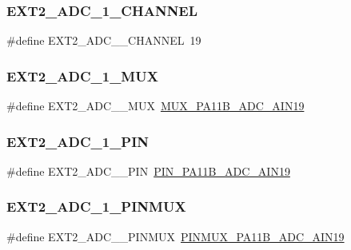 \subsubsection{\texorpdfstring{EXT2\_ADC\_1\_CHANNEL}{EXT2\_ADC\_1\_CHANNEL}}
{\footnotesize\ttfamily \#define E\+X\+T2\+\_\+\+A\+D\+C\+\_\+\_\+\+C\+H\+A\+N\+N\+EL~19}

\mbox{\label{group__samd21__xplained__pro__features__group_ga7de3785c01df710fbe80244bca6eb130}} 
\subsubsection{\texorpdfstring{EXT2\_ADC\_1\_MUX}{EXT2\_ADC\_1\_MUX}}
{\footnotesize\ttfamily \#define E\+X\+T2\+\_\+\+A\+D\+C\+\_\+\_\+\+M\+UX~\mbox{\hyperlink{pio_2samd21j18a_8h_a1c9d3ee528e4d137cb344ec37f78b536}{M\+U\+X\+\_\+\+P\+A11\+B\+\_\+\+A\+D\+C\+\_\+\+A\+I\+N19}}}

\mbox{\label{group__samd21__xplained__pro__features__group_gaf4cd3ff8f43d22ce11edfe40b02d0498}} 
\subsubsection{\texorpdfstring{EXT2\_ADC\_1\_PIN}{EXT2\_ADC\_1\_PIN}}
{\footnotesize\ttfamily \#define E\+X\+T2\+\_\+\+A\+D\+C\+\_\+\_\+\+P\+IN~\mbox{\hyperlink{pio_2samd21j18a_8h_a5f56dda410dca398fa92679ce6b01c46}{P\+I\+N\+\_\+\+P\+A11\+B\+\_\+\+A\+D\+C\+\_\+\+A\+I\+N19}}}

\mbox{\label{group__samd21__xplained__pro__features__group_ga32513ceb498b89de9facdcba65c559ca}} 
\subsubsection{\texorpdfstring{EXT2\_ADC\_1\_PINMUX}{EXT2\_ADC\_1\_PINMUX}}
{\footnotesize\ttfamily \#define E\+X\+T2\+\_\+\+A\+D\+C\+\_\+\_\+\+P\+I\+N\+M\+UX~\mbox{\hyperlink{pio_2samd21j18a_8h_a0c5a5cba5dbc784a96555e1b733ccb22}{P\+I\+N\+M\+U\+X\+\_\+\+P\+A11\+B\+\_\+\+A\+D\+C\+\_\+\+A\+I\+N19}}}

